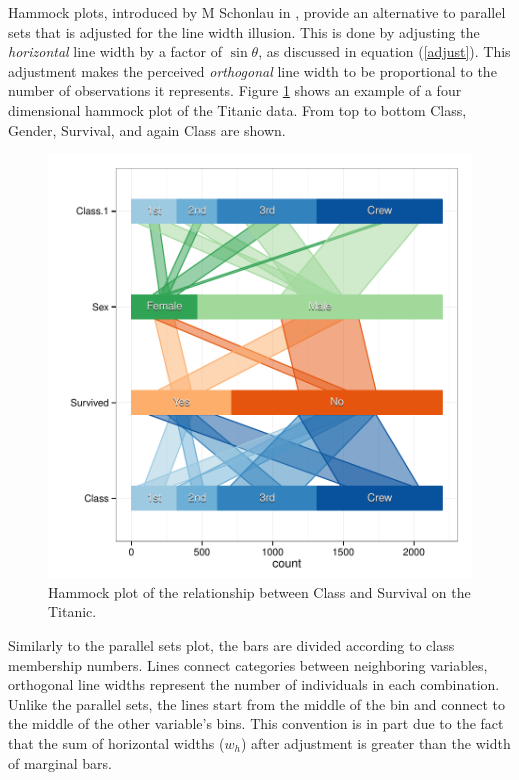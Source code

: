 \documentclass[journal]{vgtc}\usepackage{graphicx, color}
\begin{document}
Hammock plots, introduced by M Schonlau in \citep{schonlau:2003}, provide an alternative to parallel sets that is adjusted for the line width illusion. This is done by  adjusting the { \it horizontal} line width by  a factor of $\sin \theta$, as discussed in equation (\ref{adjust}). This adjustment makes the perceived {\it orthogonal} line width to be proportional to the number of observations it represents. 
 Figure \ref{hammock} shows an example of a four dimensional hammock plot of the Titanic data. From top to bottom Class, Gender, Survival, and again Class are shown. 
\begin{figure}
\centering
\includegraphics[width=\linewidth]{images/hammock-titanic}
\caption{\label{hammock} Hammock plot of the relationship between Class and Survival on the Titanic. }
\end{figure}

Similarly to the parallel sets plot, the bars are divided according to class membership numbers.  Lines connect categories between neighboring variables, orthogonal line widths  represent the number of individuals in each combination. Unlike the parallel sets, the lines start from the middle of the bin and connect to the middle of the other variable's bins. This convention is in part due to the fact that the sum of  horizontal widths ($w_h$) after adjustment is greater than the width of marginal bars.
\end{document}

